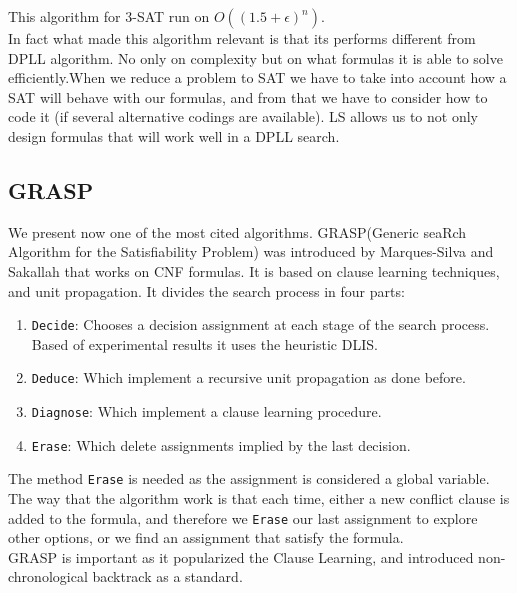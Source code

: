 This algorithm for $3$-SAT run on $O((1.5 + \epsilon)^n)$\cite{dantsin2000deterministic}.\\


In fact what made this algorithm relevant is that its performs different from DPLL algorithm. No only on complexity but on what formulas it is able to solve efficiently.When we reduce a problem to SAT we have to take into account how a SAT will behave with our formulas, and from that we have to consider how to code it (if several alternative codings are available). LS allows us to not only design formulas that will work well in a DPLL search. \\


  
\subsection{GRASP }
\label{sub:grasp}
We present now one of the most cited algorithms.  GRASP(Generic seaRch Algorithm for the Satisfiability Problem) was introduced by Marques-Silva and Sakallah\cite{marques1999grasp} that works on CNF formulas. It is based on clause learning techniques, and unit propagation. It divides the search process in four parts:

\begin{enumerate}
\item \texttt{Decide}: Chooses a decision assignment at each stage of the search process. Based of experimental results it uses the heuristic DLIS.
\item \texttt{Deduce}: Which implement a recursive unit propagation as done before.
\item \texttt{Diagnose}: Which implement a clause learning procedure.
\item \texttt{Erase}: Which delete assignments implied by the last decision.
\end{enumerate}


The method \texttt{Erase} is needed as the assignment is considered a global variable. The way that the algorithm work is that each time, either a new conflict clause is added to the formula, and therefore we \texttt{Erase} our last assignment to explore other options, or we find an assignment that satisfy the formula.\\

GRASP is important as it popularized the Clause Learning, and introduced non-chronological backtrack as a standard.


